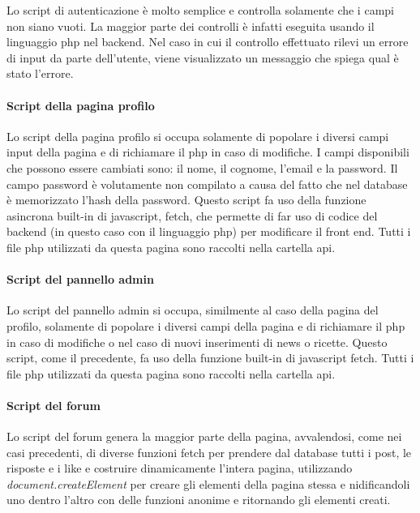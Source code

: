 Lo script di autenticazione è molto semplice e controlla solamente che i campi non siano vuoti. La maggior parte dei controlli è infatti eseguita usando il linguaggio php nel backend. Nel caso in cui il controllo effettuato rilevi un errore di input da parte dell'utente, viene visualizzato un messaggio che spiega qual è stato l'errore. 

\paragraph{Script della pagina profilo}

Lo script della pagina profilo si occupa solamente di popolare i diversi campi input della pagina e di richiamare il php in caso di modifiche. I campi disponibili che possono essere cambiati sono: il nome, il cognome, l'email e la password. Il campo password è volutamente non compilato a causa 
del fatto che nel database è memorizzato l'hash della password. Questo script fa uso della funzione asincrona built-in di javascript, fetch, che permette di far uso di codice del backend (in questo caso con il linguaggio php) per modificare il 
front end. Tutti i file php utilizzati da questa pagina sono raccolti nella cartella api.

\paragraph{Script del pannello admin}

Lo script del pannello admin si occupa, similmente al caso della pagina del profilo, solamente di popolare i diversi campi della pagina e di richiamare il php in caso di modifiche o nel caso di nuovi inserimenti di news o ricette. 
Questo script, come il precedente, fa uso della funzione built-in di javascript fetch. 
Tutti i file php utilizzati da questa pagina sono raccolti nella cartella api.

\paragraph{Script del forum}

Lo script del forum genera la maggior parte della pagina, avvalendosi, come nei casi precedenti, di diverse funzioni fetch per prendere dal database tutti i post, le risposte e i like e costruire dinamicamente l'intera pagina, utilizzando 
\textit{document.createElement} per creare gli elementi della pagina stessa e nidificandoli uno dentro l'altro con delle funzioni anonime e ritornando gli elementi creati. 




